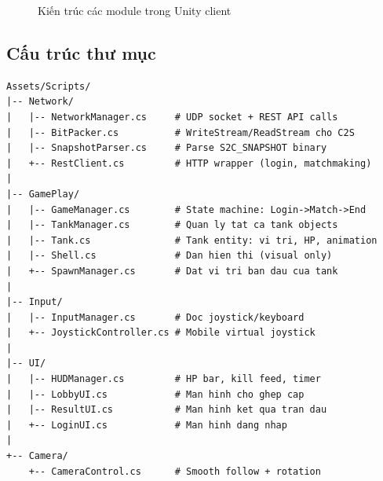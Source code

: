 \documentclass[12pt,a4paper]{report}
\begin{document}
\begin{figure}[h]
\caption{Kiến trúc các module trong Unity client}
\label{fig:unitearch}
\end{figure}

\subsection{Cấu trúc thư mục}

\begin{lstlisting}[style=bashStyle, caption={Cấu trúc Assets/Scripts của Unity client}, label={lst:unityfolders}]
Assets/Scripts/
|-- Network/
|   |-- NetworkManager.cs     # UDP socket + REST API calls
|   |-- BitPacker.cs          # WriteStream/ReadStream cho C2S
|   |-- SnapshotParser.cs     # Parse S2C_SNAPSHOT binary
|   +-- RestClient.cs         # HTTP wrapper (login, matchmaking)
|
|-- GamePlay/
|   |-- GameManager.cs        # State machine: Login->Match->End
|   |-- TankManager.cs        # Quan ly tat ca tank objects
|   |-- Tank.cs               # Tank entity: vi tri, HP, animation
|   |-- Shell.cs              # Dan hien thi (visual only)
|   +-- SpawnManager.cs       # Dat vi tri ban dau cua tank
|
|-- Input/
|   |-- InputManager.cs       # Doc joystick/keyboard
|   +-- JoystickController.cs # Mobile virtual joystick
|
|-- UI/
|   |-- HUDManager.cs         # HP bar, kill feed, timer
|   |-- LobbyUI.cs            # Man hinh cho ghep cap
|   |-- ResultUI.cs           # Man hinh ket qua tran dau
|   +-- LoginUI.cs            # Man hinh dang nhap
|
+-- Camera/
    +-- CameraControl.cs      # Smooth follow + rotation
\end{lstlisting}
\end{document}
